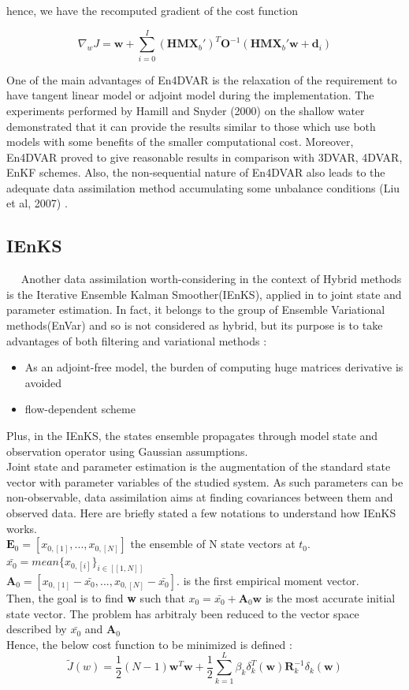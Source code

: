 \documentclass[a4,12pt]{article}
\numberwithin{equation}{section}
\begin{document}
hence, we have the recomputed gradient of the cost function

$$\nabla _{w}J = \textbf{w} + \sum_{i=0}^{I}(\textbf{HMX}_{b}')^{T}\textbf{O}^{-1}(\textbf{HMX}_{b}'\textbf{w}+\textbf{d}_{i})$$


One of the main advantages of En4DVAR is the relaxation of the requirement to have tangent linear model or adjoint model during the implementation. The experiments performed by Hamill and Snyder (2000) on the shallow water demonstrated that it can  provide the results similar to those which use both models with some benefits of the smaller computational cost. Moreover, En4DVAR proved to give reasonable results in comparison with 3DVAR, 4DVAR, EnKF schemes. Also, the non-sequential nature of En4DVAR also leads to the adequate data assimilation method accumulating some unbalance conditions (Liu et al, 2007) \cite{En4DVAR}.  


\subsection{IEnKS}
~~ Another data assimilation worth-considering in the context of Hybrid methods is the Iterative Ensemble Kalman Smoother(IEnKS), applied in \cite{jointState} to joint state and parameter estimation. In fact, it belongs to the group of Ensemble Variational methods(EnVar) and so is not considered as hybrid, but its purpose is to take advantages of both filtering and variational methods :
\begin{itemize}
\item As an adjoint-free model, the burden of computing huge matrices derivative is avoided
\item flow-dependent scheme
\end{itemize}
Plus, in the IEnKS, the states ensemble propagates through model state and observation operator using Gaussian assumptions. \\
Joint state and parameter estimation is the augmentation of the standard state vector with parameter variables of the studied system. As such parameters can be non-observable, data assimilation aims at finding covariances between them and observed data.
Here are briefly stated a few notations to understand how IEnKS works. \\
$\textbf{E}_0 = [x_{0,[1]},...,x_{0,[N]}]$ the ensemble of N state vectors at $t_0$. \\
$\bar{x_0} = mean\{x_{0,[i]}\}_{i \in [\![1,N]\!] }$ \\
$\textbf{A}_0 = [x_{0,[1]} - \bar{x_0},...,x_{0,[N]}- \bar{x_0}]$. is the first empirical moment vector.\\
Then, the goal is to find \textbf{w} such that $x_0 = \bar{x_0} + \textbf{A}_0 \textbf{w}$ is the most accurate initial state vector. The problem has arbitraly been reduced to the vector space described by $\bar{x_0}$ and $\textbf{A}_0$ \\
Hence, the below cost function to be minimized is defined : 
$$\tilde{J}(w) = \frac{1}{2}(N-1)\textbf{w}^{T}\textbf{w} + \frac{1}{2}\sum_{k=1}^{L}\beta_{k}\delta_{k}^{T}(\textbf{w})\textbf{R}_{k}^{-1}\delta_{k}(\textbf{w})$$
\end{document}
